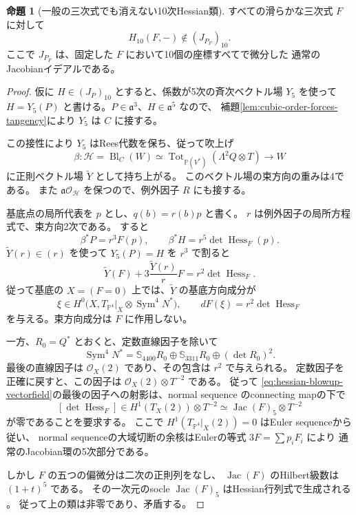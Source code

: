 \documentclass[a4paper,11pt]{ltjsarticle}
\theoremstyle{definition}
\newtheorem{theorem}{命題}[section]
\newcommand{\OO}{\mathcal O}
\newcommand{\PP}{\mathbb P}
\begin{document}
\begin{theorem}[一般の三次式でも消えない10次Hessian類]
\label{thm:all-smooth-hessian-jacobian}
すべての滑らかな三次式 $F$ に対して
\[
 \boxed{\quad H_{10}(F,-)\notin(J_{P_F})_{10}.\quad}
\]
ここで $J_{P_F}$ は、固定した $F$ において10個の座標すべてで微分した
通常のJacobianイデアルである。
\end{theorem}
\begin{proof}
仮に $H\in(J_P)_{10}$ とすると、係数が5次の斉次ベクトル場 $Y_5$ を使って
$H=Y_5(P)$ と書ける。$P\in\mathfrak a^3$、$H\in\mathfrak a^5$ なので、
補題\ref{lem:cubic-order-forces-tangency}により $Y_5$ は $C$ に接する。

この接性により $Y_5$ はRees代数を保ち、従って吹上げ
\[
 \beta\colon\mathcal H=\operatorname{Bl}_C(W)
 \simeq\operatorname{Tot}_{\PP(V^*)}(\Lambda^2Q\otimes T)
 \longrightarrow W
\]
に正則ベクトル場 $\widetilde Y$ として持ち上がる。
このベクトル場の束方向の重みは4である。
また $\mathfrak a\OO_{\mathcal H}$ を保つので、例外因子 $R$ にも接する。

基底点の局所代表を $p$ とし、$q(b)=r(b)p$ と書く。
$r$ は例外因子の局所方程式で、束方向2次である。
すると
\[
 \beta^*P=r^3F(p),\qquad
 \beta^*H=r^5\det\operatorname{Hess}_F(p).
\]
$\widetilde Y(r)\in(r)$ を使って $Y_5(P)=H$ を $r^3$ で割ると
\[
 \widetilde Y(F)+3\frac{\widetilde Y(r)}rF
       =r^2\det\operatorname{Hess}_F.
\]
従って基底の $X=(F=0)$ 上では、$\widetilde Y$ の基底方向成分が
\[
 \xi\in H^0\bigl(X,T_{\PP^4}|_X\otimes\operatorname{Sym}^4N^*\bigr),
 \qquad
 dF(\xi)=r^2\det\operatorname{Hess}_F
 \tag{H4}\label{eq:hessian-blowup-vectorfield}
\]
を与える。束方向成分は $F$ に作用しない。

一方、$R_0=Q^*$ とおくと、定数直線因子を除いて
\[
 \operatorname{Sym}^4N^*
   =\mathbb S_{4400}R_0\oplus\mathbb S_{3311}R_0
      \oplus(\det R_0)^2.
\]
最後の直線因子は $\OO_X(2)$ であり、その包含は $r^2$ で与えられる。
定数因子を正確に戻すと、この因子は $\OO_X(2)\otimes T^{-2}$ である。
従って \eqref{eq:hessian-blowup-vectorfield}の最後の因子への射影は、normal sequence のconnecting mapの下で
\[
 [\det\operatorname{Hess}_F]\in
 H^1(T_X(2))\otimes T^{-2}
 \simeq\operatorname{Jac}(F)_5\otimes T^{-2}
\]
が零であることを要求する。
ここで $H^1(T_{\PP^4}|_X(2))=0$ はEuler sequenceから従い、
normal sequenceの大域切断の余核はEulerの等式 $3F=\sum p_iF_i$ により
通常のJacobian環の5次部分である。

しかし $F$ の五つの偏微分は二次の正則列をなし、
$\operatorname{Jac}(F)$ のHilbert級数は $(1+t)^5$ である。
その一次元のsocle $\operatorname{Jac}(F)_5$ はHessian行列式で生成される
\cite[p.~2]{BDSS}。
従って上の類は非零であり、矛盾する。
\end{proof}
\end{document}
